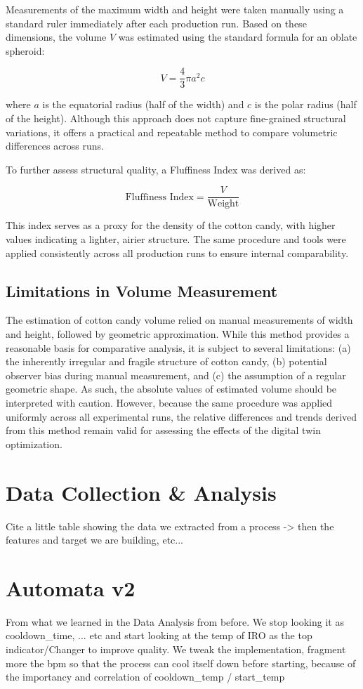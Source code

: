 Measurements of the maximum width and height were taken manually using a standard ruler immediately after each production run. Based on these dimensions, the volume \( V \) was estimated using the standard formula for an oblate spheroid:

\[
V = \frac{4}{3} \pi a^2 c
\]

where \( a \) is the equatorial radius (half of the width) and \( c \) is the polar radius (half of the height). Although this approach does not capture fine-grained structural variations, it offers a practical and repeatable method to compare volumetric differences across runs.

To further assess structural quality, a Fluffiness Index was derived as:

\[
\text{Fluffiness Index} = \frac{V}{\text{Weight}}
\]

This index serves as a proxy for the density of the cotton candy, with higher values indicating a lighter, airier structure. The same procedure and tools were applied consistently across all production runs to ensure internal comparability.

\subsection{Limitations in Volume Measurement}

The estimation of cotton candy volume relied on manual measurements of width and height, followed by geometric approximation. While this method provides a reasonable basis for comparative analysis, it is subject to several limitations: (a) the inherently irregular and fragile structure of cotton candy, (b) potential observer bias during manual measurement, and (c) the assumption of a regular geometric shape. As such, the absolute values of estimated volume should be interpreted with caution. However, because the same procedure was applied uniformly across all experimental runs, the relative differences and trends derived from this method remain valid for assessing the effects of the digital twin optimization.


\section{Data Collection \& Analysis}
Cite a little table showing the data we extracted from a process -> then the features and target we are building, etc...

\section{Automata v2}
From what we learned in the Data Analysis from before. We stop looking it as cooldown\_time, ... etc and start looking at the temp of IRO as the top indicator/Changer to improve quality. We tweak the implementation, fragment more the bpm so that the process can cool itself down before starting, because of the importancy and correlation of cooldown\_temp / start\_temp

